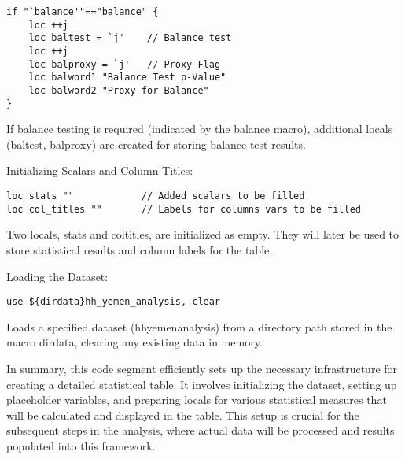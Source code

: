 \documentclass{article}
\begin{document}
\begin{mdframed}
\begin{verbatim}
if "`balance'"=="balance" {
    loc ++j
    loc baltest = `j'    // Balance test 
    loc ++j
    loc balproxy = `j'   // Proxy Flag 
    loc balword1 "Balance Test p-Value"
    loc balword2 "Proxy for Balance"  
}
\end{verbatim}
\end{mdframed}


\vspace{0.2cm}If balance testing is required (indicated by the balance macro), additional locals (baltest, balproxy) are created for storing balance test results. \newline

Initializing Scalars and Column Titles:


\begin{mdframed}
\begin{verbatim}
loc stats ""            // Added scalars to be filled
loc col_titles ""       // Labels for columns vars to be filled
\end{verbatim}
\end{mdframed}

\vspace{0.3cm}Two locals, stats and coltitles, are initialized as empty. They will later be used to store statistical results and column labels for the table.\newline

Loading the Dataset:

\begin{mdframed}
\begin{verbatim}
use ${dirdata}hh_yemen_analysis, clear
\end{verbatim}
\end{mdframed}

\vspace{0.3cm} Loads a specified dataset (hhyemenanalysis) from a directory path stored in the macro dirdata, clearing any existing data in memory.\newline


In summary, this code segment efficiently sets up the necessary infrastructure for creating a detailed statistical table. It involves initializing the dataset, setting up placeholder variables, and preparing locals for various statistical measures that will be calculated and displayed in the table. This setup is crucial for the subsequent steps in the analysis, where actual data will be processed and results populated into this framework.
\end{document}
